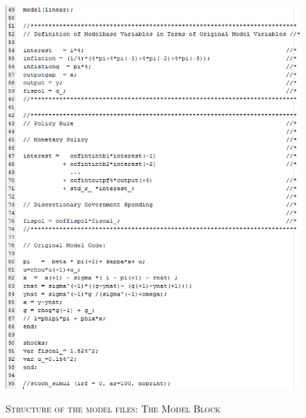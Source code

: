 \begin{figure}[H]
\centering
\caption{\textsc{Structure of the model files: The Model Block}}
\vspace{0.2cm}
\includegraphics[width=15cm,keepaspectratio]{modStructureRW97b.eps}\\
\label{img:modStructureRW97b}
\end{figure}

\vspace{2cm}


